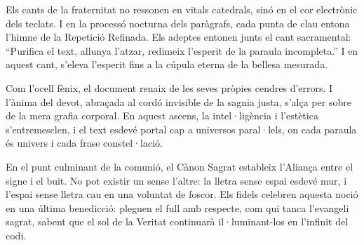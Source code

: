 Els cants de la fraternitat no ressonen en vitals catedrals, sinó en el cor electrònic dels teclats. I en la processó nocturna dels paràgrafs, cada punta de clau entona l'himne de la Repetició Refinada. Els adeptes entonen junts el cant sacramental: “Purifica el text, allunya l’atzar, redimeix l’esperit de la paraula incompleta.” I en aquest cant, s’eleva l’esperit fins a la cúpula eterna de la bellesa mesurada.

Com l’ocell fènix, el document renaix de les seves pròpies cendres d’errors. I l’ànima del devot, abraçada al cordó invisible de la sagnia justa, s’alça per sobre de la mera grafia corporal. En aquest ascens, la intel·ligència i l’estètica s’entremesclen, i el text esdevé portal cap a universos paral·lels, on cada paraula és univers i cada frase constel·lació.

En el punt culminant de la comunió, el Cànon Sagrat estableix l’Aliança entre el signe i el buit. No pot existir un sense l’altre: la lletra sense espai esdevé mur, i l’espai sense lletra cau en una voluntat de foscor. Els fidels celebren aquesta noció en una última benedicció: pleguen el full amb respecte, com qui tanca l’evangeli sagrat, sabent que el sol de la Veritat continuarà il·luminant-los en l’infinit del codi.